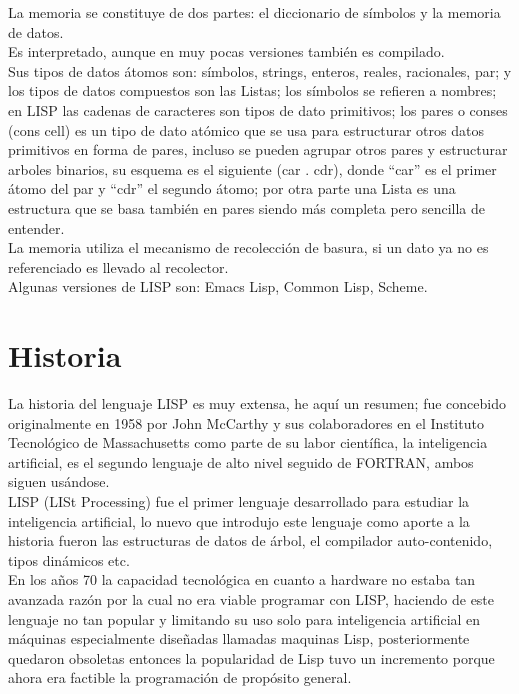 \documentclass[11pt]{article} %
\begin{document}
La memoria se constituye de dos partes: el diccionario de símbolos y la memoria de datos. \\
Es interpretado, aunque en muy pocas versiones también es compilado.\\
Sus tipos de datos átomos son: símbolos,  strings, enteros, reales, racionales, par; y los tipos de
datos compuestos son las Listas; los símbolos se refieren a nombres; en LISP las cadenas de
caracteres son tipos de dato primitivos; los pares o conses (cons cell) es un tipo de dato
atómico que se usa para estructurar otros datos primitivos en forma de pares, incluso se 
pueden agrupar otros pares y estructurar arboles binarios, su esquema es el siguiente 
(car . cdr), donde “car” es el primer átomo del par y “cdr” el segundo átomo; por otra parte una 
Lista es una estructura que se basa también en pares siendo más completa pero sencilla de entender. \\

La memoria utiliza el mecanismo de recolección de basura, si un dato ya no es referenciado es
llevado al recolector. \\
Algunas versiones de LISP son: Emacs Lisp, Common Lisp, Scheme.\\



\section{Historia}
La historia del lenguaje LISP es muy extensa, he aquí un resumen; fue concebido originalmente en 1958 por  
John McCarthy y sus colaboradores en el Instituto Tecnológico de Massachusetts como parte de su labor científica, 
la inteligencia artificial, es el segundo lenguaje de alto nivel seguido de FORTRAN, ambos siguen usándose. \\

LISP (LISt Processing) fue el primer lenguaje desarrollado para estudiar la inteligencia
artificial, lo nuevo que introdujo este lenguaje como aporte a la historia fueron las estructuras
de datos de árbol, el compilador auto-contenido, tipos dinámicos etc.\\



En los años 70 la capacidad tecnológica en cuanto a hardware no estaba tan avanzada razón
por la cual no era viable programar con LISP, haciendo de este lenguaje no tan popular y 
limitando su uso solo para inteligencia artificial en máquinas especialmente diseñadas
llamadas maquinas Lisp, posteriormente quedaron obsoletas entonces la popularidad de Lisp tuvo
un incremento porque ahora era factible la programación de  propósito general. \\
\end{document}
